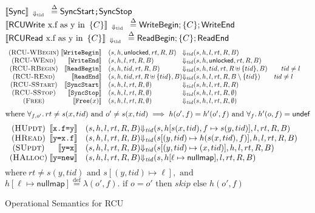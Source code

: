 \begin{figure*}\scriptsize%
  \grammar
   $\llbracket\textsf{Sync}\rrbracket_{\;\;\Downarrow_{\mathrm{tid}}\;\;} \overset{\Delta}{=} \texttt{\textsf{SyncStart};\textsf{SyncStop}}$ \\
  $\llbracket\textsf{RCUWrite} \text{ x.f as y in }\, \{ C \}\rrbracket_{\;\;\Downarrow_{\mathrm{tid}}\;\;} \overset{\Delta}{=} \texttt{\textsf{WriteBegin}} ; \{C\} ;\textsf{WriteEnd}$\\
  $\llbracket\textsf{RCURead} \text{ x.f as y in }\, \{ C \}\rrbracket_{\;\;\Downarrow_{\mathrm{tid}}\;\;} \overset{\Delta}{=} \texttt{\textsf{ReadBegin}}; \{C\} ;\textsf{ReadEnd}$
\[\begin{array}{c@{\;}rl@{\Downarrow_{\mathit{tid}}}ll} 
(\textsc{RCU-WBegin}) & \llbracket\texttt{WriteBegin}\rrbracket & (s,h,\mathsf{unlocked},rt,R,B) &(s,h,l,rt,R,B) & \\
(\textsc{RCU-WEnd}) & \llbracket\texttt{WriteEnd}\rrbracket & (s,h,l,rt,R,B) & (s,h,\mathsf{unlocked},rt,R,B) & \\
(\textsc{RCU-RBegin}) & \llbracket\texttt{ReadBegin}\rrbracket & (s,h,tid,rt,R,B) & (s,h,tid,rt,R\uplus \{tid\},B) \qquad \mathit{tid} \neq l &  \\
(\textsc{RCU-REnd}) & \llbracket\texttt{ReadEnd}\rrbracket & (s,h,tid,rt,R\uplus\{tid\},B) & (s,h,l,rt,R,B\setminus \{tid\}) \qquad  \mathit{tid} \neq l& \\
(\textsc{RCU-SStart}) & \llbracket\texttt{SyncStart}\rrbracket & (s,h,l,rt,R,\emptyset) & (s,h,l,rt,R,R) &\\  %
(\textsc{RCU-SStop}) & \llbracket\texttt{SyncStop}\rrbracket & (s,h,l,rt,R,\emptyset) & (s,h,l,rt,R,\emptyset) &  \\
(\textsc{Free}) & {\llbracket\texttt{Free}(x)\rrbracket} & (s,h,l,rt,R,\emptyset) & (s,h,l,rt,R,\emptyset) &
\end{array}\]
$\textrm{where}~ \forall_{f,o'}\ldotp rt \neq s(x,tid) \textrm{ and } o' \neq s(x,tid) \implies h(o',f) = h'(o',f) \textrm{ and } \forall_{f}\ldotp h'(o,f)=\textsf{undef}$
\[\begin{array}{c@{\;}rl@{\Downarrow_{\mathit{tid}}}ll} 
(\textsc{HUpdt}) & \llbracket\texttt{x.f=y}\rrbracket   &(s,h,l,rt,R,B)& (s,h[s(x,tid),f \mapsto s(y,tid)],l,rt,R,B) &\\
(\textsc{HRead})   & \llbracket\texttt{y=x.f}\rrbracket   &(s,h,l,rt,R,B)& (s[(y,tid) \mapsto h(s(x,tid),f)],h,l,rt,R,B) & \\
(\textsc{SUpdt}) & \llbracket\texttt{y=x}\rrbracket     &(s,h,l,rt,R,B)& (s[(y,tid) \mapsto (x,tid)],h,l,rt,R,B) &\\
(\textsc{HAlloc}) & \llbracket\texttt{y=new}\rrbracket &(s,h,l,rt,R,B)& (s,h[\ell\mapsto\mathsf{nullmap}],l,rt,R,B) & 
\end{array}\]
$\textrm{where}~ rt \neq s(y,tid) \textrm{ and } s[(y,tid) \mapsto \ell], \textrm{ and }$
$h[\ell \mapsto \mathsf{nullmap}] \overset{\mathrm{def}}{=} \lambda (o',f) . \textrm{ if } o=o' \textrm{ then } skip \textrm{ else } h(o',f) $
\caption{Operational Semantics for \textsf{RCU}}
\label{fig:operationalsemrcu}
\vspace{-2mm}
\end{figure*}%


